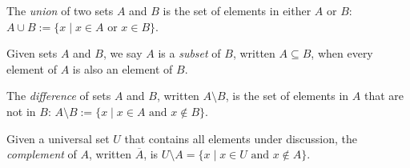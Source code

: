 \documentclass[11pt]{article}
\begin{document}
\begin{definition}[Union]
The \emph{union} of two sets $A$ and $B$ is the set of elements in either $A$ or $B$:
$A \cup B :=  \{ x \mid x \in A \text{ or } x \in B\}$.
\end{definition}

\begin{center}
\end{center}

\begin{definition}[Subset]
Given sets $A$ and $B$, we say $A$ is a \emph{subset} of $B$, written $A \subseteq B$, when every element of $A$ is also an element of $B$.
\end{definition}

\begin{definition}
The \emph{difference} of sets $A$ and $B$, written $A \setminus B$, is the set of elements in $A$ that are not in $B$:
$A \setminus B := \{x \mid x \in A \text{ and } x \notin B\}$.
\end{definition}

\begin{center}
\end{center}

\begin{definition}[Complement]
Given a universal set $U$ that contains all elements under discussion, the \emph{complement} of $A$, written $\overline{A}$, is $U \setminus A = \{x \mid x \in U \text{ and } x \notin A\}$.
\end{definition}
\end{document}
